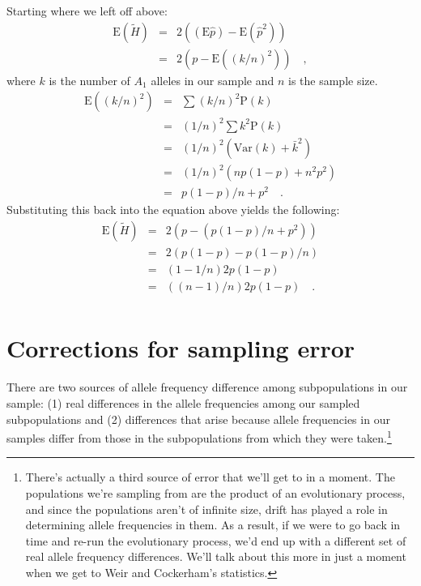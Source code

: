 Starting where we left off above:
\begin{eqnarray*}
\mbox{E}(\tilde H) &=& 2\left((\mbox{E}\hat p) - \mbox{E}({\hat p}^2)\right) \\
     &=& 2\left(p - \mbox{E}\left((k/n)^2\right)\right) \quad ,
\end{eqnarray*}
where $k$ is the number of $A_1$ alleles in our sample and $n$ is the
sample size.
\begin{eqnarray*}
\mbox{E}\left((k/n)^2\right) &=& \sum (k/n)^2 \mbox{P}(k) \\
                      &=& (1/n)^2 \sum k^2 \mbox{P}(k) \\
                      &=& (1/n)^2 \left(\mbox{Var}(k) + \bar k^2\right) \\
                      &=& (1/n)^2 \left(np(1-p) + n^2p^2\right) \\
                      &=& p(1-p)/n + p^2 \quad .
\end{eqnarray*}
Substituting this back into the equation above yields the following:
\begin{eqnarray*}
\mbox{E}(\tilde H) &=& 2\left(p - \left(p(1-p)/n + p^2\right)\right) \\
     &=& 2\left(p(1-p) - p(1-p)/n\right) \\
     &=& \left(1 - 1/n\right)2p(1-p) \\
     &=& ((n-1)/n)2p(1-p) \quad . \\
\end{eqnarray*}

\section*{Corrections for sampling error}

There are two sources of allele frequency difference among
subpopulations in our sample: (1) real differences in the allele
frequencies among our sampled subpopulations and (2) differences that
arise because allele frequencies in our samples differ from those in
the subpopulations from which they were taken.\footnote{There's
  actually a third source of error that we'll get to in a moment. The
  populations we're sampling from are the product of an evolutionary
  process, and since the populations aren't of infinite size, drift
  has played a role in determining allele frequencies in them. As a
  result, if we were to go back in time and re-run the evolutionary
  process, we'd end up with a different set of real allele frequency
  differences. We'll talk about this more in just a moment when we get
  to Weir and Cockerham's statistics.}

